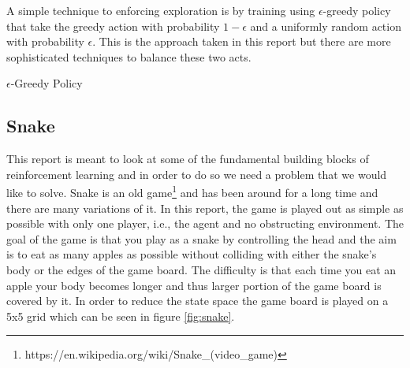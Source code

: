 \documentclass[result.tex]{subfiles}
\begin{document}
    A simple technique to enforcing exploration is by training using $\epsilon$-greedy policy that take the greedy action with probability $1 - \epsilon$ and a uniformly random action with probability $\epsilon$. This is the approach taken in this report but there are more sophisticated techniques to balance these two acts.

    \begin{algorithm}[H]
        \caption{$\epsilon$-Greedy Policy}
        \label{alg:epslion-greedy-policy}
        \begin{algorithmic}[1]
            \Statex
            \Else
            \EndIf
            \State
            \EndFunction
        \end{algorithmic}
    \end{algorithm}

    \subsection*{Snake}

    This report is meant to look at some of the fundamental building blocks of reinforcement learning and in order to do so we need a problem that we would like to solve. Snake is an old game\footnote{https://en.wikipedia.org/wiki/Snake\_(video\_game)} and has been around for a long time and there are many variations of it. In this report, the game is played out as simple as possible with only one player, i.e., the agent and no obstructing environment. The goal of the game is that you play as a snake by controlling the head and the aim is to eat as many apples as possible without colliding with either the snake's body or the edges of the game board. The difficulty is that each time you eat an apple your body becomes longer and thus larger portion of the game board is covered by it. In order to reduce the state space the game board is played on a 5x5 grid which can be seen in figure \ref{fig:snake}.
\end{document}
